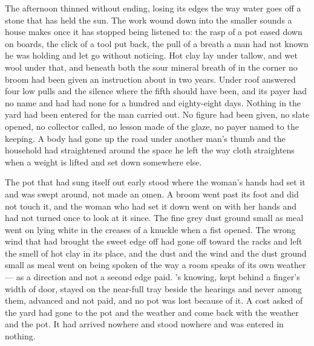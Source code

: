 The afternoon thinned without ending, losing its edges the way water goes off a stone that has held the sun. The work wound down into the smaller sounds a house makes once it has stopped being listened to: the rasp of a pot eased down on boards, the click of a tool put back, the pull of a breath a man had not known he was holding and let go without noticing. Hot clay lay under tallow, and wet wool under that, and beneath both the sour mineral breath of  in the corner no broom had been given an instruction about in two years. Under  roof  answered four low pulls and the silence where the fifth should have been, and its payer had no name and had had none for a hundred and eighty-eight days. Nothing in the yard had been entered for the man carried out. No figure had been given, no slate opened, no collector called, no lesson made of the glaze, no payer named to the keeping. A body had gone up the road under another man's thumb and the household had straightened around the space he left the way cloth straightens when a weight is lifted and set down somewhere else.

The pot that had sung itself out early stood where the woman's hands had set it and was swept around, not made an omen. A broom went past its foot and did not touch it, and the woman who had set it down went on with her hands and had not turned once to look at it since. The fine grey dust ground small as meal went on lying white in the creases of a knuckle when a fist opened. The wrong wind that had brought the sweet edge off  had gone off toward the racks and left the smell of hot clay in its place, and the dust and the wind and the dust ground small as meal went on being spoken of the way a room speaks of its own weather --- as a direction and not a second edge paid. 's knowing, kept behind a finger's width of door, stayed on the near-full tray beside the hearings and never among them, advanced and not paid, and no pot was lost because of it. A cost asked of the yard had gone to the pot and the weather and come back with the weather and the pot. It had arrived nowhere and stood nowhere and was entered in nothing.

